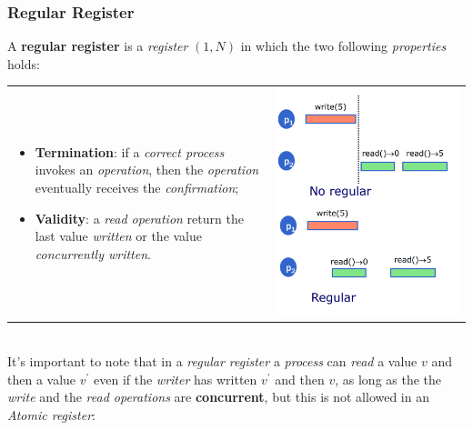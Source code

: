 \documentclass{article}
\begin{document}
\subsubsection{Regular Register}
A \textbf{regular register} is a \emph{register} $(1,N)$ in which the two following \emph{properties} holds:\\
\begin{tabular}{C{9.8cm}  L{10.5cm}}
\begin{itemize}
\item \textbf{Termination}: if a \emph{correct process} invokes an \emph{operation}, then the \emph{operation} eventually receives the \emph{confirmation};
\item \textbf{Validity}: a \emph{read operation} return the last value \emph{written} or the value \emph{concurrently written}.
\end{itemize} & \includegraphics[scale=0.4]{cattura63.png} \end{tabular}\\
It's important to note that in a \emph{regular register} a \emph{process} can \emph{read} a value $v$ and then a value $v^{'}$ even if the \emph{writer} has written $v^{'}$ and then $v$, as long as the the \emph{write} and the\emph{ read operations} are \textbf{concurrent}, but this is not allowed in an \emph{Atomic register}:
\end{document}
